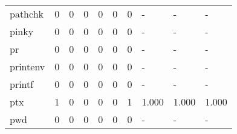 \begin{longtable}{lp{1.3cm}p{1.3cm}p{1.3cm}p{1.3cm}p{1.3cm}p{1.3cm}p{1.3cm}p{1.3cm}p{1.3cm}}
pathchk   &                      0 &                                             0 &                                            0 &                                           0 &                                            0 &                                          0 &                                    - &                                      - &                                    - \\
pinky     &                      0 &                                             0 &                                            0 &                                           0 &                                            0 &                                          0 &                                    - &                                      - &                                    - \\
pr        &                      0 &                                             0 &                                            0 &                                           0 &                                            0 &                                          0 &                                    - &                                      - &                                    - \\
printenv  &                      0 &                                             0 &                                            0 &                                           0 &                                            0 &                                          0 &                                    - &                                      - &                                    - \\
printf    &                      0 &                                             0 &                                            0 &                                           0 &                                            0 &                                          0 &                                    - &                                      - &                                    - \\
ptx       &                      1 &                                             0 &                                            0 &                                           0 &                                            0 &                                          1 &                                1.000 &                                  1.000 &                                1.000 \\
pwd       &                      0 &                                             0 &                                            0 &                                           0 &                                            0 &                                          0 &                                    - &                                      - &                                    - \\

\end{longtable}
